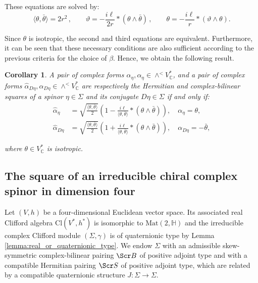 \documentclass[10pt,a4paper,twoside,reqno]{amsart}
\theoremstyle{plain}
\newtheorem{cor}[thm]{Corollary}
\theoremstyle{definition}
\theoremstyle{remark}
\newcommand{\Mat}{\mathrm{Mat}}
\def\C{\mathbb{C}}
\def\scB{\Scr B}
\def\scS{\Scr S}
\newcommand{\escal}[1]{\langle#1\rangle}
\begin{document}
\noindent
These equations are solved by: 
\begin{equation*}
\escal{\theta,\bar{\theta}} = 2r^2    \, , \qquad \vartheta = - \frac{i\ell}{2r}*(\theta\wedge \bar{\theta})\, , \qquad \theta=-\frac{i\ell}{r}*(\vartheta\wedge\theta).
\end{equation*}

\noindent
Since $\theta$ is isotropic, the second and third equations are equivalent. Furthermore, it can be seen that these necessary conditions are also sufficient according to the previous criteria for the choice of $\beta$. Hence, we obtain the following result.

\begin{cor}
A pair of complex forms $\widehat{\alpha}_\eta, \alpha_\eta \in \wedge^< V^{\ast}_{\mathbb{C}}$, and a pair of complex forms $\widehat{\alpha}_{D\eta}, \alpha_{D\eta} \in \wedge^< V^{\ast}_{\mathbb{C}}$ are respectively the Hermitian and complex-bilinear squares of a spinor $\eta\in\Sigma$ and its conjugate $D\eta\in\Sigma$ if and only if:
\begin{equation*}
\begin{aligned}
\widehat{\alpha}_\eta & =\sqrt{\frac{\escal{\theta,\bar\theta}}{2}}\left(1-\frac{i\ell}{\escal{\theta,\bar\theta}}*(\theta\wedge\bar\theta)\right),\quad \alpha_\eta=\theta,\\
\widehat{\alpha}_{D\eta}&=\sqrt{\frac{\escal{\theta,\bar\theta}}{2}}\left(1+\frac{i\ell}{\escal{\theta,\bar\theta}}*(\theta\wedge\bar\theta)\right),\quad \alpha_{D\eta}=-\bar\theta,
\end{aligned}
\end{equation*}

where $\theta\in V^*_\C$ is isotropic.
\end{cor}


\subsection{The square of an irreducible chiral complex spinor in dimension four}
\label{subsec:square4dEuclidean}


Let $(V,h)$ be a four-dimensional Euclidean vector space. Its associated real Clifford algebra $\mathrm{Cl}(V^*,h^*)$ is isomorphic to $\Mat(2,\mathbb{H})$ and the irreducible complex Clifford module $(\Sigma,\gamma)$ is of quaternionic type by Lemma \ref{lemma:real_or_quaternionic_type}. We endow $\Sigma$ with an admissible skew-symmetric complex-bilinear pairing $\scB$ of positive adjoint type and with a compatible Hermitian pairing $\scS$ of positive adjoint type, which are related by a compatible quaternionic structure $J\colon\Sigma\to\Sigma$.
\end{document}
